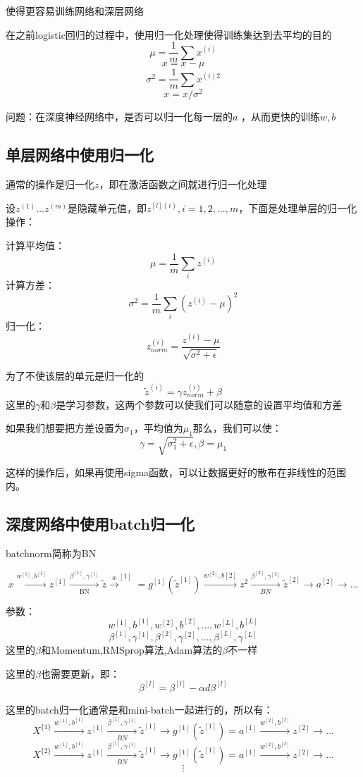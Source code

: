 \documentclass[UTF8]{ctexrep}
\begin{document}
使得更容易训练网络和深层网络

在之前logistic回归的过程中，使用归一化处理使得训练集达到去平均的目的
$$\mu = \frac1m\sum x^{(i)}$$
$$x = x-\mu$$
$$\sigma^2 = \frac1m\sum x^{(i)2}$$
$$x = x/\sigma^2$$

问题：在深度神经网络中，是否可以归一化每一层的$a$
，从而更快的训练$w,b$

\subsection{单层网络中使用归一化}
通常的操作是归一化$z$，即在激活函数之间就进行归一化处理

设$z^{(1)}\dots z^{(m)}$是隐藏单元值，即$z^{[l](i)},i=1,2,\dots,m$，下面是处理单层的归一化操作：

计算平均值：
$$\mu = \frac1m\sum_iz^{(i)}$$
计算方差：
$$\sigma^2 = \frac1m\sum_i(z^{(i)}-\mu)^2$$
归一化：
$$z_{norm}^{(i)}=\frac{z^{(i)}-\mu}{\sqrt{\sigma^2+\epsilon}}$$

为了不使该层的单元是归一化的
$$\tilde z^{(i)} = \gamma z^{(i)}_{norm}+\beta$$
这里的$\gamma$和$\beta$是学习参数，这两个参数可以使我们可以随意的设置平均值和方差

如果我们想要把方差设置为$\sigma_1$，平均值为$\mu_1$那么，我们可以使：
$$\gamma = \sqrt{\sigma_1^2+\epsilon},\beta = \mu_1$$

这样的操作后，如果再使用sigma函数，可以让数据更好的散布在非线性的范围内。

\subsection{深度网络中使用batch归一化}

batchnorm简称为BN

$$x \xrightarrow{w^{[1]},b^{[1]}}z^{[1]}\xrightarrow[\text{BN}]{\beta^{[1]},\gamma^{[1]}}\tilde z\xrightarrow a^{[1]}=g^{[1]}(\tilde z^{[1]})\xrightarrow{w^{[2]},b{[2]}}z^{2}
\xrightarrow[BN]{\beta^{[2]},\gamma^{[2]}}\tilde z^{[2]}\to a^{[2]}\to \dots$$

参数：
$$w^{[1]},b^{[1]},w^{[2]},b^{[2]},\dots,w^{[L]},b^{[L]}$$
$$\beta^{[1]},\gamma^{[1]},\beta^{[2]},\gamma^{[2]},\dots,\beta^{[L]},\gamma^{[L]}$$
这里的$\beta$和Momentum,RMSprop算法,Adam算法的$\beta$不一样

这里的$\beta$也需要更新，即：
$$\beta^[l] = \beta^[l]-\alpha d\beta^[l]$$

这里的batch归一化通常是和mini-batch一起进行的，所以有：
$$X^{\{1\}}\xrightarrow{w^{[1]},b^{[1]}}z^{[1]}\xrightarrow[BN]{\beta^{[1]},\gamma^{[1]}}\tilde z^{[1]}\to g^{[1]}(\tilde z^{[1]})=a^{[1]}\xrightarrow{w^{[2]},b^{[2]}}z^{[2]}\to \dots$$
$$X^{\{2\}}\xrightarrow{w^{[1]},b^{[1]}}z^{[1]}\xrightarrow[BN]{\beta^{[1]},\gamma^{[1]}}\tilde z^{[1]}\to g^{[1]}(\tilde z^{[1]})=a^{[1]}\xrightarrow{w^{[2]},b^{[2]}}z^{[2]}\to \dots$$
$$\vdots$$
\end{document}
